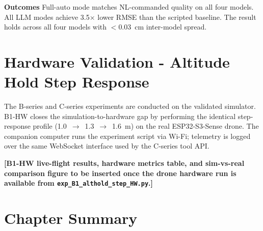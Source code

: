 \textbf{Outcomes} Full-auto mode matches NL-commanded quality on all four models. 
All LLM modes achieve 3.5$\times$ lower RMSE than the
scripted baseline. 
The result holds across all four models with $<$0.03~cm inter-model spread.

\section{Hardware Validation - Altitude Hold Step Response}
\label{sec:ch3_b1hw}

%
%
%

The B-series and C-series experiments are conducted on the validated
simulator. B1-HW closes the simulation-to-hardware gap by performing the
identical step-response profile (1.0~$\to$~1.3~$\to$~1.6~m) on the real
ESP32-S3-Sense drone. The companion computer runs the experiment script via
Wi-Fi; telemetry is logged over the same WebSocket interface used by the
C-series tool API.

\textbf{[B1-HW live-flight results, hardware metrics table, and sim-vs-real
comparison figure to be inserted once the drone hardware run is
available from \texttt{exp\_B1\_althold\_step\_HW.py}.]}


\section{Chapter Summary}
\label{sec:ch3_summary}

